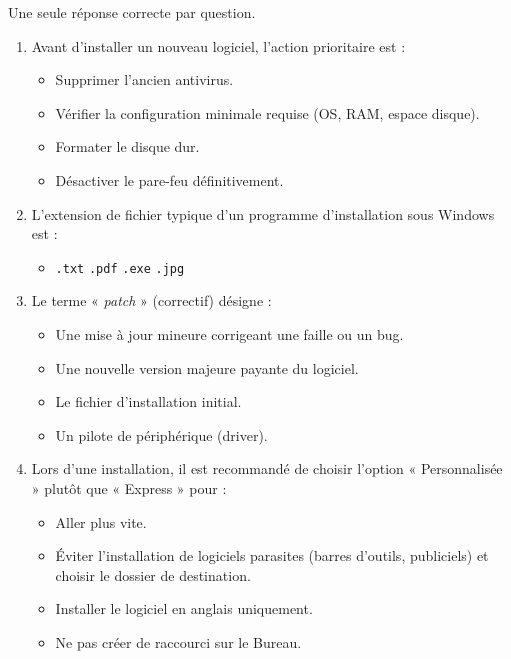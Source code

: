 \documentclass[11pt]{article}
\begin{document}
\begin{exercice}
Une seule réponse correcte par question.
\begin{enumerate}
    \item Avant d'installer un nouveau logiciel, l'action prioritaire est :
    \begin{itemize}
        \item[A.] Supprimer l'ancien antivirus.
        \item[B.] Vérifier la configuration minimale requise (OS, RAM, espace disque).
        \item[C.] Formater le disque dur.
        \item[D.] Désactiver le pare-feu définitivement.
    \end{itemize}
    \item L'extension de fichier typique d'un programme d'installation sous Windows est :
    \begin{itemize}
        \item[A.] \texttt{.txt} \quad [B.] \texttt{.pdf} \quad [C.] \texttt{.exe} \quad [D.] \texttt{.jpg}
    \end{itemize}
    \item Le terme « \textit{patch} » (correctif) désigne :
    \begin{itemize}
        \item[A.] Une mise à jour mineure corrigeant une faille ou un bug.
        \item[B.] Une nouvelle version majeure payante du logiciel.
        \item[C.] Le fichier d'installation initial.
        \item[D.] Un pilote de périphérique (driver).
    \end{itemize}
    \item Lors d'une installation, il est recommandé de choisir l'option « Personnalisée » plutôt que « Express » pour :
    \begin{itemize}
        \item[A.] Aller plus vite.
        \item[B.] Éviter l'installation de logiciels parasites (barres d'outils, publiciels) et choisir le dossier de destination.
        \item[C.] Installer le logiciel en anglais uniquement.
        \item[D.] Ne pas créer de raccourci sur le Bureau.
    \end{itemize}
\end{enumerate}
\end{exercice}
\end{document}
